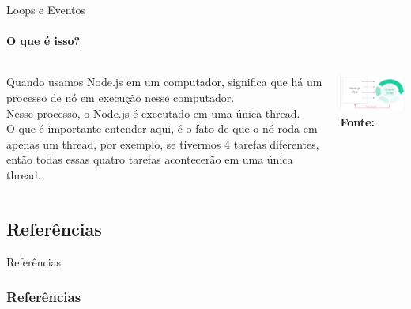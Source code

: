 \documentclass{beamer}
\begin{document}
    \begin{frame}[label=lists]{Loops e Eventos}
     \framesubtitle{O que é isso?}%
      \begin{columns}[onlytextwidth]
         Quando usamos Node.js em um computador, significa que há um processo de nó em execução nesse computador. 
         \\
	Nesse processo, o Node.js é executado em uma única thread. \\
	O que é importante entender aqui, é o fato de que o nó roda em apenas um thread, por exemplo, se tivermos 4 tarefas diferentes, então todas essas quatro tarefas acontecerão em uma única thread.          
          \vspace{0.5cm}
	
            \includegraphics[width=65mm]{resources/aula1_8.png}\\
            \tiny{\textbf{Fonte:} \cite{ich2021}}

      \end{columns}
    \end{frame}
   \subsection{Referências}
    \begin{frame}{Referências}%
\frametitle{Referências}
\small
\begin{center}
\tiny


\end{center}
\end{frame}
\end{document}
